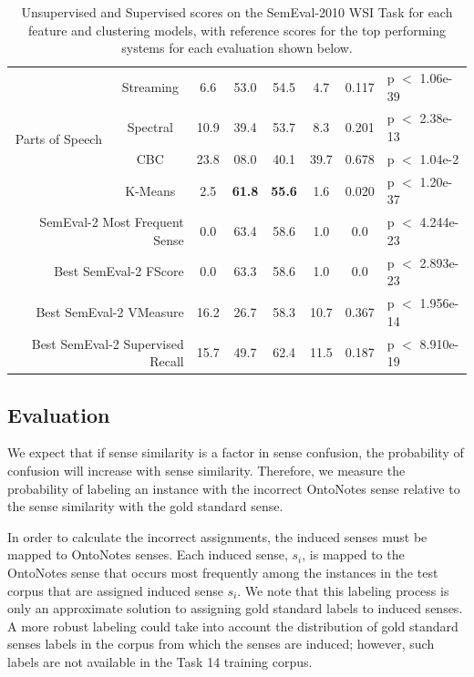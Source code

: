 \documentclass[11pt]{article}
\begin{document}
\begin{table}[!ftb]
\begin{tabular}{ c  c  c  c  c  c c l }
    \multirow{4}{*}{Parts of Speech}
& Streaming & 6.6 & 53.0 & 54.5 & 4.7 & 0.117 & p $<$ 1.06e-39 \\
& Spectral & 10.9 & 39.4 & 53.7 & 8.3 & 0.201 & p $<$ 2.38e-13 \\
& CBC & 23.8 & 08.0 & 40.1 & 39.7 & 0.678 & p $<$ 1.04e-2 \\
& K-Means & 2.5 & \textbf{61.8} & \textbf{55.6} & 1.6 & 0.020 & p $<$ 1.20e-37 \\
  \midrule
  \midrule

 \multicolumn{2}{r}{SemEval-2 Most Frequent Sense}
& 0.0 & 63.4 & 58.6 & 1.0 & 0.0 & p $<$ 4.244e-23 \\
  \cmidrule{3-8}

 \multicolumn{2}{r}{Best SemEval-2 FScore}
& 0.0 & 63.3 & 58.6 & 1.0 & 0.0 & p $<$ 2.893e-23 \\
  \cmidrule{3-8}
 \multicolumn{2}{r}{Best SemEval-2 VMeasure}
& 16.2 & 26.7 & 58.3 & 10.7 & 0.367 & p $<$ 1.956e-14 \\
  \cmidrule{3-8}
 \multicolumn{2}{r}{Best SemEval-2 Supervised Recall}
& 15.7 & 49.7 & 62.4 & 11.5 & 0.187 & p $<$ 8.910e-19 \\
    \bottomrule

  \end{tabular}
  \caption{Unsupervised and Supervised scores on the SemEval-2010 WSI Task for
    each feature and clustering models, with reference scores for the top
    performing systems for each evaluation shown below.}
  \label{tab:semeval-scores}
\end{table}

\subsection{Evaluation}


We expect that if sense similarity is a factor in sense confusion, the
probability of confusion will increase with sense similarity.  Therefore, we
measure the probability of labeling an instance with the incorrect OntoNotes
sense relative to the sense similarity with the gold standard sense.  

In order to calculate the incorrect assignments, the induced senses must be
mapped to OntoNotes senses.  
%
Each induced sense, $s_i$, is mapped to the OntoNotes sense that occurs most
frequently among the instances in the test corpus that are assigned induced
sense $s_i$.
We note that this labeling process is only an approximate solution to assigning
gold standard labels to induced senses. A more robust labeling could take into
account the distribution of gold standard senses labels in the corpus from which
the senses are induced; however, such labels are not available in the Task 14
training corpus.
\end{document}
